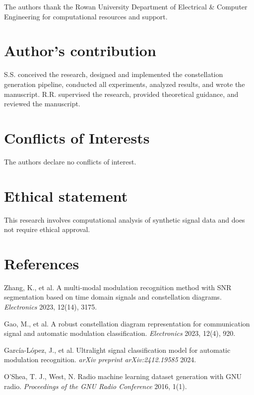 \documentclass{ELSP}
\begin{document}
{{The authors thank the Rowan University Department of Electrical \& Computer Engineering for computational resources and support.

\section*{Author's contribution}

S.S. conceived the research, designed and implemented the constellation generation pipeline, conducted all experiments, analyzed results, and wrote the manuscript. R.R. supervised the research, provided theoretical guidance, and reviewed the manuscript.

\section*{Conflicts of Interests}

The authors declare no conflicts of interest.

\section*{Ethical statement}

This research involves computational analysis of synthetic signal data and does not require ethical approval.

\section*{References}

\setlength{\parindent}{0em}

Zhang, K., et al. A multi-modal modulation recognition method with SNR segmentation based on time domain signals and constellation diagrams. \textit{Electronics} 2023, 12(14), 3175.

Gao, M., et al. A robust constellation diagram representation for communication signal and automatic modulation classification. \textit{Electronics} 2023, 12(4), 920.

García-López, J., et al. Ultralight signal classification model for automatic modulation recognition. \textit{arXiv preprint arXiv:2412.19585} 2024.

O'Shea, T. J., West, N. Radio machine learning dataset generation with GNU radio. \textit{Proceedings of the GNU Radio Conference} 2016, 1(1).

}}
\end{document}

